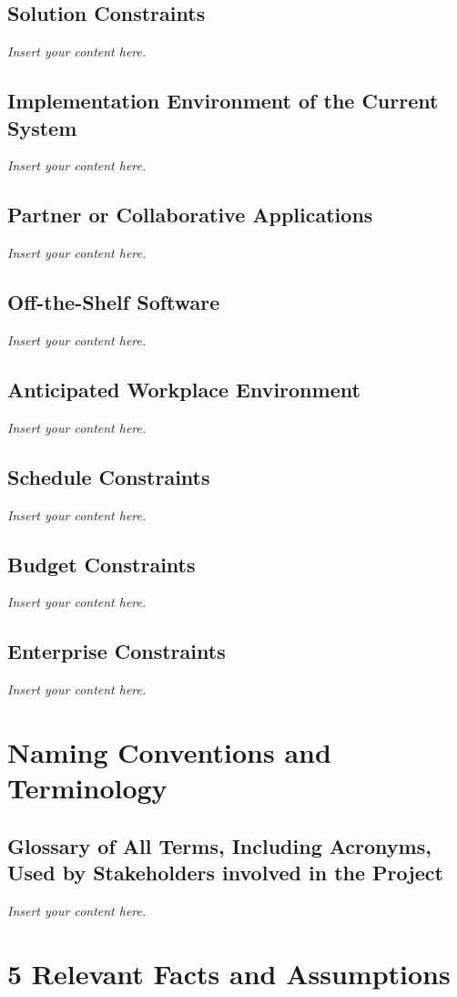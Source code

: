 \documentclass[12pt]{article}
\newcommand{\lips}{\textit{Insert your content here.}}
\begin{document}
\subsection{Solution Constraints}
\lips
\subsection{Implementation Environment of the Current System}
\lips
\subsection{Partner or Collaborative Applications}
\lips
\subsection{Off-the-Shelf Software}
\lips
\subsection{Anticipated Workplace Environment}
\lips
\subsection{Schedule Constraints}
\lips
\subsection{Budget Constraints}
\lips
\subsection{Enterprise Constraints}
\lips

\section{Naming Conventions and Terminology}
\subsection{Glossary of All Terms, Including Acronyms, Used by Stakeholders
involved in the Project}
\lips

\section*{5 Relevant Facts and Assumptions}
\end{document}
